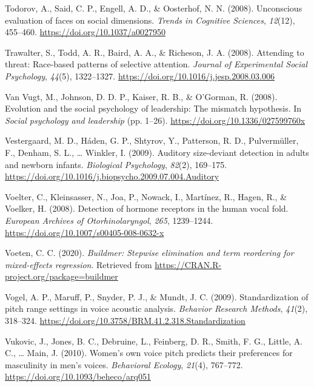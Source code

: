 \documentclass[
  english,
  man, noextraspace,floatsintext]{apa6}
\newlength{\cslhangindent}
\newenvironment{cslreferences}%
  {\setlength{\parindent}{0pt}%
  \everypar{\setlength{\hangindent}{\cslhangindent}}\ignorespaces}%
  {\par}
\begin{document}
\begin{cslreferences}
\leavevmode\hypertarget{ref-Todorov2008}{}%
Todorov, A., Said, C. P., Engell, A. D., \& Oosterhof, N. N. (2008). Unconscious evaluation of faces on social dimensions. \emph{Trends in Cognitive Sciences}, \emph{12}(12), 455--460. \url{https://doi.org/10.1037/a0027950}

\leavevmode\hypertarget{ref-Trawalter2008}{}%
Trawalter, S., Todd, A. R., Baird, A. A., \& Richeson, J. A. (2008). Attending to threat: Race-based patterns of selective attention. \emph{Journal of Experimental Social Psychology}, \emph{44}(5), 1322--1327. \url{https://doi.org/10.1016/j.jesp.2008.03.006}

\leavevmode\hypertarget{ref-VanVugt2008}{}%
Van Vugt, M., Johnson, D. D. P., Kaiser, R. B., \& O'Gorman, R. (2008). Evolution and the social psychology of leadership: The mismatch hypothesis. In \emph{Social psychology and leadership} (pp. 1--26). \url{https://doi.org/10.1336/027599760x}

\leavevmode\hypertarget{ref-Vestergaard2009}{}%
Vestergaard, M. D., Háden, G. P., Shtyrov, Y., Patterson, R. D., Pulvermüller, F., Denham, S. L., \ldots{} Winkler, I. (2009). Auditory size-deviant detection in adults and newborn infants. \emph{Biological Psychology}, \emph{82}(2), 169--175. \url{https://doi.org/10.1016/j.biopsycho.2009.07.004.Auditory}

\leavevmode\hypertarget{ref-Voelter2008}{}%
Voelter, C., Kleinsasser, N., Joa, P., Nowack, I., Martínez, R., Hagen, R., \& Voelker, H. (2008). Detection of hormone receptors in the human vocal fold. \emph{European Archives of Otorhinolaryngol}, \emph{265}, 1239--1244. \url{https://doi.org/10.1007/s00405-008-0632-x}

\leavevmode\hypertarget{ref-R-buildmer}{}%
Voeten, C. C. (2020). \emph{Buildmer: Stepwise elimination and term reordering for mixed-effects regression}. Retrieved from \url{https://CRAN.R-project.org/package=buildmer}

\leavevmode\hypertarget{ref-Vogel2009}{}%
Vogel, A. P., Maruff, P., Snyder, P. J., \& Mundt, J. C. (2009). Standardization of pitch range settings in voice acoustic analysis. \emph{Behavior Research Methods}, \emph{41}(2), 318--324. \url{https://doi.org/10.3758/BRM.41.2.318.Standardization}

\leavevmode\hypertarget{ref-Vukovic2010}{}%
Vukovic, J., Jones, B. C., Debruine, L., Feinberg, D. R., Smith, F. G., Little, A. C., \ldots{} Main, J. (2010). Women's own voice pitch predicts their preferences for masculinity in men's voices. \emph{Behavioral Ecology}, \emph{21}(4), 767--772. \url{https://doi.org/10.1093/beheco/arq051}


\end{cslreferences}
\end{document}
